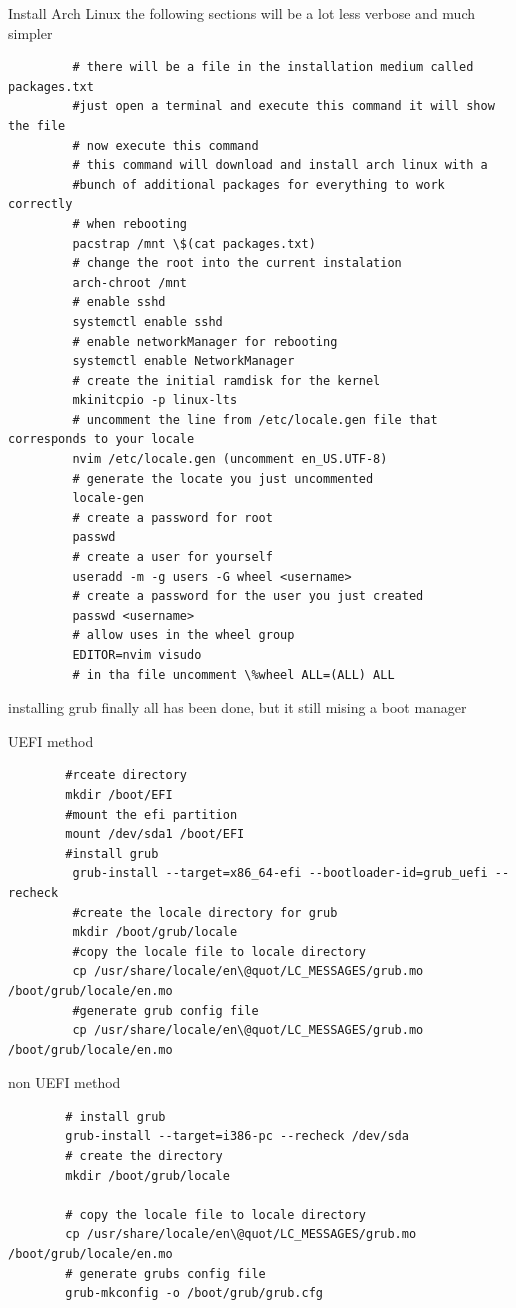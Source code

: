 \begin{section}{Install Arch Linux}
	 the following sections will be a lot less verbose and much simpler
	 \begin{verbatim}
		 # there will be a file in the installation medium called packages.txt 
		 #just open a terminal and execute this command it will show the file
		 # now execute this command
		 # this command will download and install arch linux with a
		 #bunch of additional packages for everything to work correctly
		 # when rebooting
		 pacstrap /mnt \$(cat packages.txt)
		 # change the root into the current instalation
		 arch-chroot /mnt
		 # enable sshd
		 systemctl enable sshd
		 # enable networkManager for rebooting
		 systemctl enable NetworkManager
		 # create the initial ramdisk for the kernel
		 mkinitcpio -p linux-lts
		 # uncomment the line from /etc/locale.gen file that corresponds to your locale
		 nvim /etc/locale.gen (uncomment en_US.UTF-8)
		 # generate the locate you just uncommented
		 locale-gen
		 # create a password for root
		 passwd
		 # create a user for yourself
		 useradd -m -g users -G wheel <username>
		 # create a password for the user you just created
		 passwd <username>
		 # allow uses in the wheel group
		 EDITOR=nvim visudo
		 # in tha file uncomment \%wheel ALL=(ALL) ALL
	 \end{verbatim}
\end{section}
\newpage
\begin{section}{installing grub}
	finally all has been done, 
	but it still mising a boot manager
	\begin{Large}
		UEFI method
	\end{Large}
	\begin{verbatim}
		#rceate directory
		mkdir /boot/EFI
		#mount the efi partition
		mount /dev/sda1 /boot/EFI
		#install grub
		 grub-install --target=x86_64-efi --bootloader-id=grub_uefi --recheck
		 #create the locale directory for grub
		 mkdir /boot/grub/locale
		 #copy the locale file to locale directory
		 cp /usr/share/locale/en\@quot/LC_MESSAGES/grub.mo /boot/grub/locale/en.mo
		 #generate grub config file
		 cp /usr/share/locale/en\@quot/LC_MESSAGES/grub.mo /boot/grub/locale/en.mo
	\end{verbatim}

	\begin{Large}
		non UEFI method
	\end{Large}
	\begin{verbatim}
		# install grub
		grub-install --target=i386-pc --recheck /dev/sda
		# create the directory 
		mkdir /boot/grub/locale

		# copy the locale file to locale directory
		cp /usr/share/locale/en\@quot/LC_MESSAGES/grub.mo /boot/grub/locale/en.mo
		# generate grubs config file
		grub-mkconfig -o /boot/grub/grub.cfg

	\end{verbatim}

\end{section}
